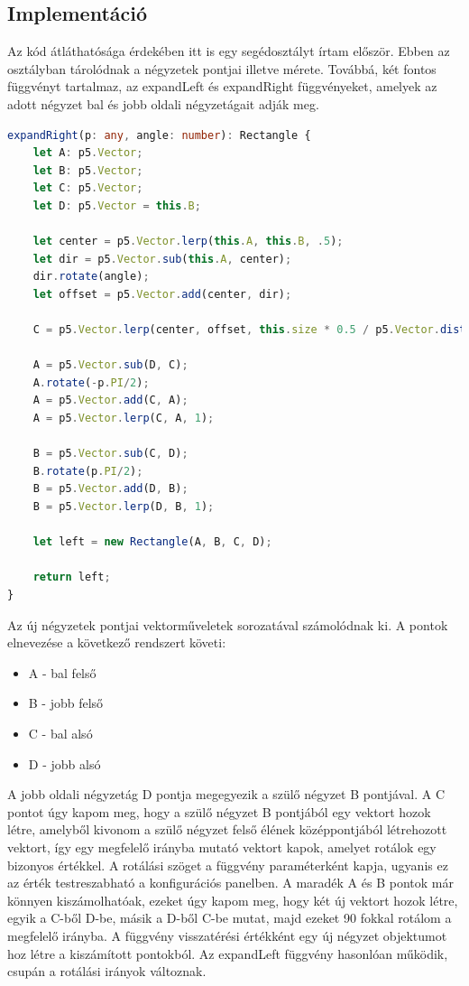 \subsection*{Implementáció}
Az kód átláthatósága érdekében itt is egy segédosztályt írtam először. Ebben az osztályban tárolódnak a négyzetek pontjai illetve mérete. Továbbá, két fontos függvényt tartalmaz, az expandLeft és expandRight függvényeket, amelyek az adott négyzet bal és jobb oldali négyzetágait adják meg. 
\begin{lstlisting}[language=typescript]
expandRight(p: any, angle: number): Rectangle {
	let A: p5.Vector;
	let B: p5.Vector;
	let C: p5.Vector;
	let D: p5.Vector = this.B;
	
	let center = p5.Vector.lerp(this.A, this.B, .5);
	let dir = p5.Vector.sub(this.A, center);
	dir.rotate(angle);
	let offset = p5.Vector.add(center, dir);
	
	C = p5.Vector.lerp(center, offset, this.size * 0.5 / p5.Vector.dist(offset, center));
	
	A = p5.Vector.sub(D, C);
	A.rotate(-p.PI/2);
	A = p5.Vector.add(C, A);
	A = p5.Vector.lerp(C, A, 1);
	
	B = p5.Vector.sub(C, D);
	B.rotate(p.PI/2);
	B = p5.Vector.add(D, B);
	B = p5.Vector.lerp(D, B, 1);
	
	let left = new Rectangle(A, B, C, D);
	
	return left;
}
\end{lstlisting}
Az új négyzetek pontjai vektorműveletek sorozatával számolódnak ki. A pontok elnevezése a következő rendszert követi: 
\begin{itemize}
	\item A - bal felső
	\item B - jobb felső
	\item C - bal alsó
	\item D - jobb alsó
\end{itemize}
A jobb oldali négyzetág D pontja megegyezik a szülő négyzet B pontjával. A C pontot úgy kapom meg, hogy a szülő négyzet B pontjából egy vektort hozok létre, amelyből kivonom a szülő négyzet felső élének középpontjából létrehozott vektort, így egy megfelelő irányba mutató vektort kapok, amelyet rotálok egy bizonyos értékkel. A rotálási szöget a függvény paraméterként kapja, ugyanis ez az érték testreszabható a konfigurációs panelben. A maradék A és B pontok már könnyen kiszámolhatóak, ezeket úgy kapom meg, hogy két új vektort hozok létre, egyik a C-ből D-be, másik a D-ből C-be mutat, majd ezeket 90 fokkal rotálom a megfelelő irányba. A függvény visszatérési értékként egy új négyzet objektumot hoz létre a kiszámított pontokból. Az expandLeft függvény hasonlóan működik, csupán a rotálási irányok változnak. 
